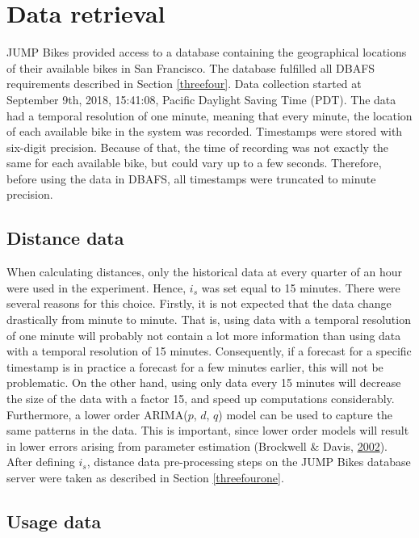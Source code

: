 \documentclass[12pt,oneside]{reedthesis}
\begin{document}
\section{Data retrieval}\label{data-retrieval}

JUMP Bikes provided access to a database containing the geographical
locations of their available bikes in San Francisco. The database
fulfilled all DBAFS requirements described in Section \ref{threefour}.
Data collection started at September 9th, 2018, 15:41:08, Pacific
Daylight Saving Time (PDT). The data had a temporal resolution of one
minute, meaning that every minute, the location of each available bike
in the system was recorded. Timestamps were stored with six-digit
precision. Because of that, the time of recording was not exactly the
same for each available bike, but could vary up to a few seconds.
Therefore, before using the data in DBAFS, all timestamps were truncated
to minute precision.

\subsection{Distance data}\label{distance-data}

When calculating distances, only the historical data at every quarter of
an hour were used in the experiment. Hence, \(i_{s}\) was set equal to
15 minutes. There were several reasons for this choice. Firstly, it is
not expected that the data change drastically from minute to minute.
That is, using data with a temporal resolution of one minute will
probably not contain a lot more information than using data with a
temporal resolution of 15 minutes. Consequently, if a forecast for a
specific timestamp is in practice a forecast for a few minutes earlier,
this will not be problematic. On the other hand, using only data every
15 minutes will decrease the size of the data with a factor 15, and
speed up computations considerably. Furthermore, a lower order
ARIMA(\(p\), \(d\), \(q\)) model can be used to capture the same
patterns in the data. This is important, since lower order models will
result in lower errors arising from parameter estimation (Brockwell \&
Davis, \protect\hyperlink{ref-brockwell2002}{2002}). After defining
\(i_{s}\), distance data pre-processing steps on the JUMP Bikes database
server were taken as described in Section \ref{threefourone}.

\subsection{Usage data}\label{usage-data}
\end{document}
